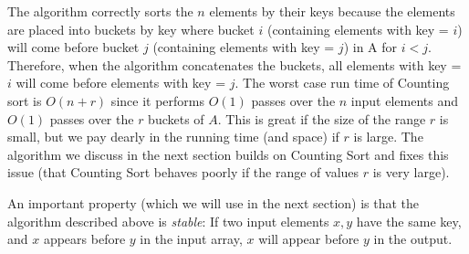 \documentclass [12pt]{article}
\begin{document}
The algorithm correctly sorts the $n$ elements by their keys because the elements are placed into buckets by key where bucket $i$ (containing elements with key = $i$) will come before bucket $j$ (containing elements with key = $j$) in A for $i < j$. Therefore, when the algorithm concatenates the buckets, all elements with key = $i$ will come before elements with key = $j$. The worst case run time of Counting sort is $O(n+r)$ since it performs $O(1)$ passes over the $n$ input elements and $O(1)$ passes over the $r$ buckets of $A$. This is great if the size of the range $r$ is small, but we pay dearly in the running time (and space) if $r$ is large. The algorithm we discuss in the next section builds on Counting Sort and fixes this issue (that Counting Sort
behaves poorly if the range of values $r$ is very large).

An important property (which we will use in the next section) is that the algorithm described above is \textit{stable}: If two input elements $x, y$ have the same key, and $x$ appears before $y$ in the input array, $x$ will appear before $y$ in the output.
\end{document}
